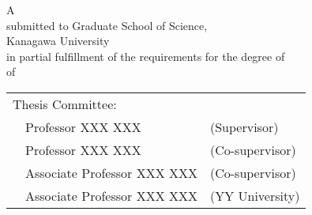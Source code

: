 \renewcommand\thepage{Title2}
\thispagestyle{empty}
\vspace*{8.9truecm}
\begin{center}
 A \edoctitle \\
 submitted to Graduate School of Science, \\
 Kanagawa University \\
 in partial fulfillment of the requirements for the degree of \\
 {\degree} of \major \\
 \bigskip

 \eauthor

 \vspace*{4.8truemm}

 \centering
 \begin{tabular}[t]{p{}ll}
  \multicolumn{2}{l}{Thesis Committee:} \\
  & Professor XXX XXX & (Supervisor) \\
  & Professor XXX XXX & (Co-supervisor) \\
  & Associate Professor XXX XXX & (Co-supervisor) \\
  & Associate Professor XXX XXX & (YY University)
 \end{tabular}
\end{center}
